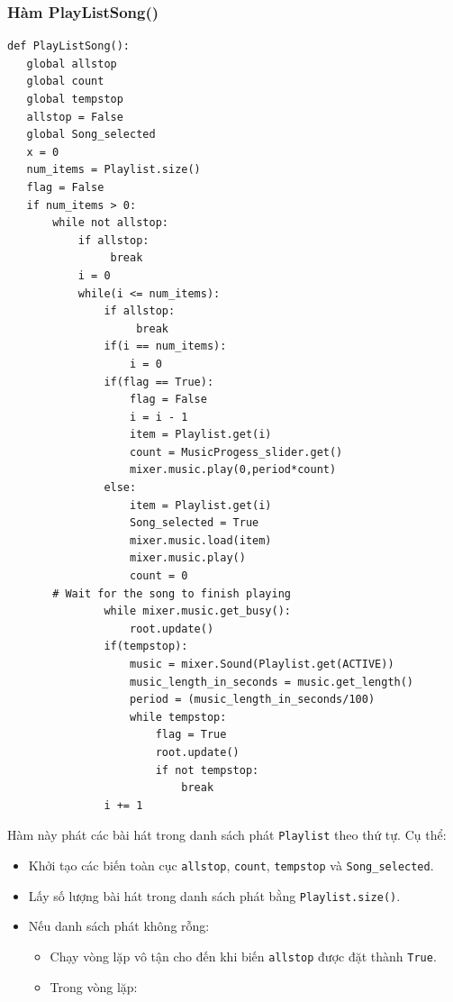 \documentclass[a4paper]{article}
\begin{document}
\begin{enumerate}
\subsubsection{Hàm PlayListSong()}
\begin{mdframed}[hidealllines=true,backgroundcolor=magenta!10]
\begin{lstlisting}
def PlayListSong():
   global allstop
   global count
   global tempstop
   allstop = False
   global Song_selected
   x = 0
   num_items = Playlist.size()
   flag = False
   if num_items > 0:
       while not allstop:
           if allstop:
                break
           i = 0
           while(i <= num_items):
               if allstop:
                    break
               if(i == num_items):
                   i = 0
               if(flag == True):
                   flag = False
                   i = i - 1
                   item = Playlist.get(i)
                   count = MusicProgess_slider.get()
                   mixer.music.play(0,period*count)
               else:
                   item = Playlist.get(i)
                   Song_selected = True
                   mixer.music.load(item)
                   mixer.music.play()
                   count = 0
       # Wait for the song to finish playing
               while mixer.music.get_busy():
                   root.update()
               if(tempstop):
                   music = mixer.Sound(Playlist.get(ACTIVE))
                   music_length_in_seconds = music.get_length()
                   period = (music_length_in_seconds/100)
                   while tempstop:
                       flag = True
                       root.update()
                       if not tempstop:
                           break
               i += 1
\end{lstlisting}
\end{mdframed}
Hàm này phát các bài hát trong danh sách phát \texttt{Playlist} theo thứ tự. Cụ thể:
\begin{itemize}
   \item Khởi tạo các biến toàn cục \texttt{allstop}, \texttt{count}, \texttt{tempstop} và \texttt{Song\_selected}.
   \item Lấy số lượng bài hát trong danh sách phát bằng \texttt{Playlist.size()}.
   \item Nếu danh sách phát không rỗng:
       \begin{itemize}
           \item Chạy vòng lặp vô tận cho đến khi biến \texttt{allstop} được đặt thành \texttt{True}.
           \item Trong vòng lặp:

\end{itemize}
\end{itemize}
\end{enumerate}
\end{document}
